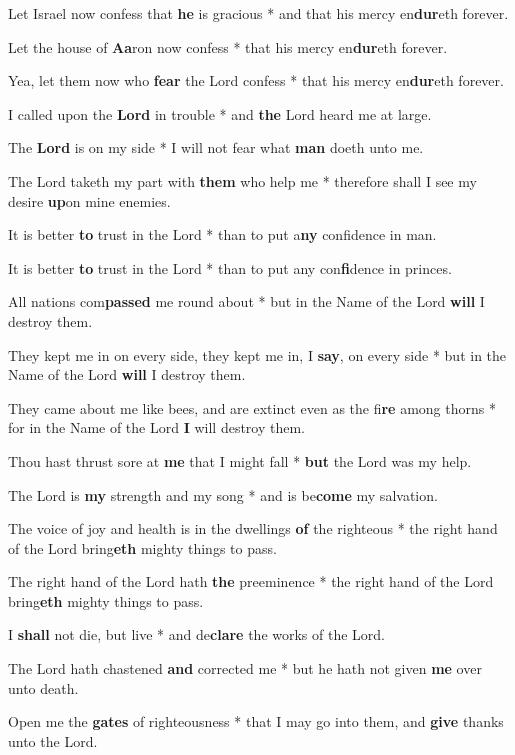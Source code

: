 \begin{multicols}{2}
	Let Israel now confess that \textbf{he} is gracious * and that his mercy en\textbf{dur}eth forever.
	
	Let the house of \textbf{Aa}ron now confess * that his mercy en\textbf{dur}eth forever.
	
	Yea, let them now who \textbf{fear} the Lord confess * that his mercy en\textbf{dur}eth forever.
	
	I called upon the \textbf{Lord} in trouble * and \textbf{the} Lord heard me at large.
	
	The \textbf{Lord} is on my side * I will not fear what \textbf{man} doeth unto me.
	
	The Lord taketh my part with \textbf{them} who help me * therefore shall I see my desire \textbf{up}on mine enemies.
	
	It is better \textbf{to} trust in the Lord * than to put a\textbf{ny} confidence in man.
	
	It is better \textbf{to} trust in the Lord * than to put any con\textbf{fi}dence in princes.
	
	All nations com\textbf{passed} me round about * but in the Name of the Lord \textbf{will} I destroy them.
	
	They kept me in on every side, they kept me in, I \textbf{say}, on every side * but in the Name of the Lord \textbf{will} I destroy them.
	
	They came about me like bees, and are extinct even as the fi\textbf{re} among thorns * for in the Name of the Lord \textbf{I} will destroy them.
	
	Thou hast thrust sore at \textbf{me} that I might fall * \textbf{but} the Lord was my help.
	
	The Lord is \textbf{my} strength and my song * and is be\textbf{come} my salvation.
	
	The voice of joy and health is in the dwellings \textbf{of} the righteous * the right hand of the Lord bring\textbf{eth} mighty things to pass.
	
	The right hand of the Lord hath \textbf{the} preeminence * the right hand of the Lord bring\textbf{eth} mighty things to pass.
	
	I \textbf{shall} not die, but live * and de\textbf{clare} the works of the Lord.
	
	The Lord hath chastened \textbf{and} corrected me * but he hath not given \textbf{me} over unto death.
	
	Open me the \textbf{gates} of righteousness * that I may go into them, and \textbf{give} thanks unto the Lord.
	

\end{multicols}
